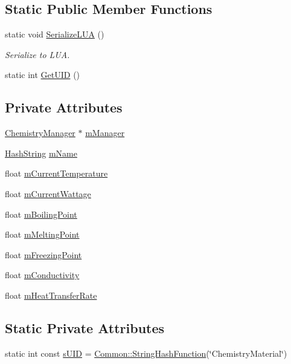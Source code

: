 \subsection*{Static Public Member Functions}
\begin{DoxyCompactItemize}
\item 
static void \hyperlink{classChemistryMaterial_a49a6bf73f781091468d000c9760d969a}{Serialize\+L\+UA} ()
\begin{DoxyCompactList}\small\item\em Serialize to L\+UA. \end{DoxyCompactList}\item 
static int \hyperlink{classChemistryMaterial_ab7a07bf9cf41694681dd29ebf8b102b3}{Get\+U\+ID} ()
\end{DoxyCompactItemize}
\subsection*{Private Attributes}
\begin{DoxyCompactItemize}
\item 
\hyperlink{classChemistryManager}{Chemistry\+Manager} $\ast$ \hyperlink{classChemistryMaterial_afebb0a227f7f72dcb3e7dc063f31a59d}{m\+Manager}
\item 
\hyperlink{classHashString}{Hash\+String} \hyperlink{classChemistryMaterial_adf9b0dde3f152ce1b811f0ceaa1e4c2b}{m\+Name}
\item 
float \hyperlink{classChemistryMaterial_acdf7f62cf2879887171441700a9bfb79}{m\+Current\+Temperature}
\item 
float \hyperlink{classChemistryMaterial_a5202313db6b25671d3e9ffabcd22410a}{m\+Current\+Wattage}
\item 
float \hyperlink{classChemistryMaterial_acc2f58f43485b64d584c8519b7a42a1a}{m\+Boiling\+Point}
\item 
float \hyperlink{classChemistryMaterial_aed7be13b668ef2b28f953e6d1db7a514}{m\+Melting\+Point}
\item 
float \hyperlink{classChemistryMaterial_aaf2f04beeb88954c488a8ceb8670698d}{m\+Freezing\+Point}
\item 
float \hyperlink{classChemistryMaterial_af8b790b8370a436c739a8e940d5f6991}{m\+Conductivity}
\item 
float \hyperlink{classChemistryMaterial_a7356f2450db88635bdd34c29bec3401a}{m\+Heat\+Transfer\+Rate}
\end{DoxyCompactItemize}
\subsection*{Static Private Attributes}
\begin{DoxyCompactItemize}
\item 
static int const \hyperlink{classChemistryMaterial_a4813b379e8e51e9e7ac2c23363ac32f4}{s\+U\+ID} = \hyperlink{namespaceCommon_a994c43a8ea7b03968186a635687a6521}{Common\+::\+String\+Hash\+Function}(\char`\"{}Chemistry\+Material\char`\"{})
\end{DoxyCompactItemize}


